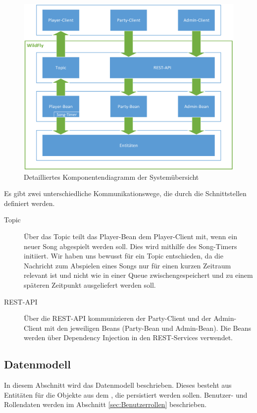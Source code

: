 \begin{figure}[H]
	\centering
	\includegraphics[width=0.9\linewidth]{Bilder/ArchitekturGesamt}
	\caption{Detailliertes Komponentendiagramm der Systemübersicht}
	\label{fig:ArchitekturGesamtDiagramm}
\end{figure}

Es gibt zwei unterschiedliche Kommunikationswege, die durch die Schnittstellen definiert werden. 

\begin{description}
\item [Topic] Über das Topic teilt das Player-Bean dem Player-Client mit, wenn ein neuer Song abgespielt werden soll. Dies wird mithilfe des Song-Timers initiiert. Wir haben uns bewusst für ein Topic entschieden, da die Nachricht zum Abspielen eines Songs nur für einen kurzen Zeitraum relevant ist und nicht wie in einer Queue zwischengespeichert und zu einem späteren Zeitpunkt ausgeliefert werden soll. 
\item [REST-API]
Über die REST-API kommunizieren der Party-Client und der Admin-Client mit den jeweiligen Beans (Party-Bean und Admin-Bean). Die Beans werden über Dependency Injection in den REST-Services verwendet. 
\end{description}


\subsection{Datenmodell}

In diesem Abschnitt wird das Datenmodell beschrieben. Dieses besteht aus Entitäten für die Objekte aus dem , die persistiert werden sollen. Benutzer- und Rollendaten werden im Abschnitt \ref{sec:Benutzerrollen} beschrieben.

